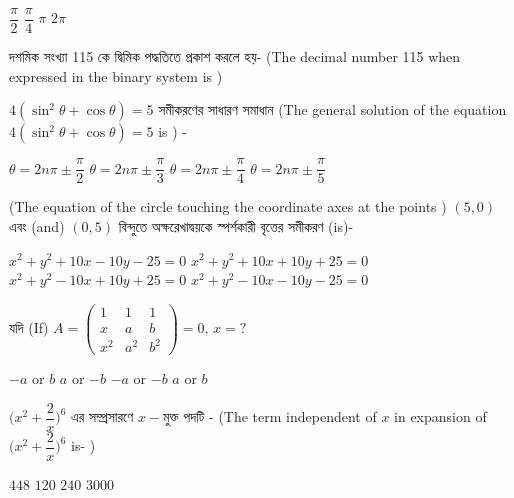 \documentclass[addpoints]{exam}
\begin{document}
\begin{questions}
\begin{oneparchoices}
\choice $ \dfrac{\pi}{2} $
\choice $ \dfrac{\pi}{4} $
\choice $ \pi $
\choice $2\pi $
\end{oneparchoices}

\question দশমিক সংখ্যা 115 কে দ্বিমিক পদ্ধতিতে প্রকাশ করলে হয়- (The decimal number 115 when expressed in the binary system is )

\begin{oneparchoices}
\end{oneparchoices}

\question  $ 4(\sin^{2} \theta + \cos \theta ) = 5 $ সমীকরণের সাধারণ সমাধান (The general solution of the equation  $ 4(\sin^{2} \theta + \cos \theta ) = 5 $ is ) - 

\begin{oneparchoices}
\choice $ \theta =  2n\pi \pm \dfrac{\pi}{2} $
\choice $ \theta =  2n\pi \pm \dfrac{\pi}{3} $
\choice $ \theta =  2n\pi \pm \dfrac{\pi}{4} $
\choice $ \theta = 2n\pi \pm \dfrac{\pi}{5} $
\end{oneparchoices}



\question (The equation of the circle touching the coordinate axes at the points ) $ (5,0) $ এবং (and) $ (0,5) $ বিন্দুতে অক্ষরেখাদ্বয়কে স্পর্শকারী বৃত্তের সমীকরণ (is)- 

\begin{oneparchoices}
\choice $ x^{2}+y^{2}+10x-10y-25=0 $
\choice $ x^{2}+y^{2}+10x+10y+25=0 $
\choice $ x^{2}+y^{2}-10x+10y+25=0 $
\choice $ x^{2}+y^{2}-10x-10y-25=0 $
\end{oneparchoices}

\question  যদি (If) $ A = \begin{pmatrix}
1 & 1 & 1\\
x & a & b\\
x^{2} & a^{2} & b^{2}
\end{pmatrix} =0,\, x=?  $

\begin{oneparchoices}
\choice $ -a $ or $ b $
\choice $ a $ or $ -b $
\choice $-a$ or $ -b $
\choice $ a $ or $b$
\end{oneparchoices}

\question $ \Big(x^{2}+\dfrac{2}{x} \Big)^{6}$ এর সম্প্রসারণে $ x- $মুক্ত পদটি - (The term independent of $ x $ in expansion of $ \Big(x^{2}+\dfrac{2}{x} \Big)^{6}$ is- )

\begin{oneparchoices}
\choice $ 448 $
\choice $ 120 $
\choice $ 240 $
\choice $ 3000 $
\end{oneparchoices}


\end{questions}
\end{document}
